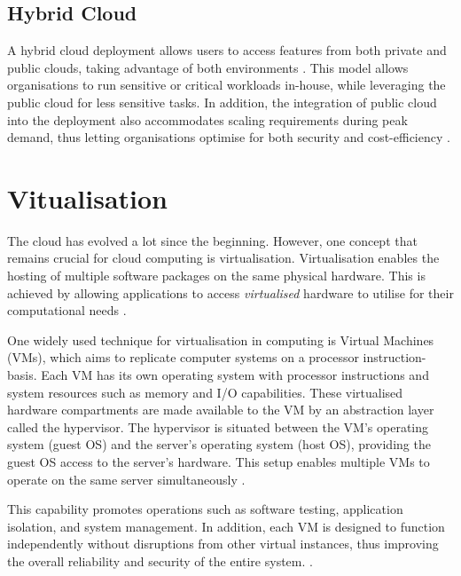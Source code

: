 \subsection{Hybrid Cloud}

A hybrid cloud deployment allows users to access features from both private and public clouds, taking advantage of both environments \cite{ramgovind2010management, dash2016governance}. This model allows organisations to run sensitive or critical workloads in-house, while leveraging the public cloud for less sensitive tasks. In addition, the integration of public cloud into the deployment also accommodates scaling requirements during peak demand, thus letting organisations optimise for both security and cost-efficiency \cite{huangAchievingBigData2014}.




\section{Vitualisation}

The cloud has evolved a lot since the beginning. However, one concept that remains crucial for cloud computing is virtualisation. Virtualisation enables the hosting of multiple software packages on the same physical hardware. This is achieved by allowing applications to access \textit{virtualised} hardware to utilise for their computational needs \cite{goldbergSurveyVirtualMachine1974}.

One widely used technique for virtualisation in computing is Virtual Machines (VMs), which aims to replicate computer systems on a processor instruction-basis. Each VM has its own operating system with processor instructions and system resources such as memory and I/O capabilities. These virtualised hardware compartments are made available to the VM by an abstraction layer called the hypervisor. The hypervisor is situated between the VM's operating system (guest OS) and the server's operating system (host OS), providing the guest OS access to the server's hardware. This setup enables multiple VMs to operate on the same server simultaneously \cite{goldbergSurveyVirtualMachine1974}.

This capability promotes operations such as software testing, application isolation, and system management. In addition, each VM is designed to function independently without disruptions from other virtual instances, thus improving the overall reliability and security of the entire system. \cite{goldbergSurveyVirtualMachine1974}.

